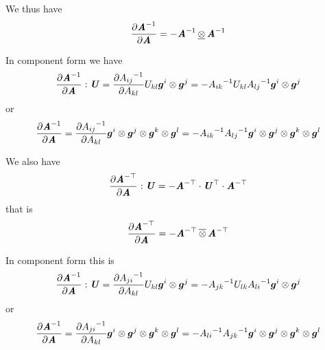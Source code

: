 We thus have
\begin{equation}
  \delby{\inverse{\tensortwo{A}}}{\tensortwo{A}}=\lowertensorprod{-\inverse{\tensortwo{A}}}{\inverse{\tensortwo{A}}}
  \label{eqn:DerivInverseTensorSecondOrder}
\end{equation}

In component form we have
\begin{equation}
    \dfrac{\partial {\ensuremath{\boldsymbol{\mathit{A}}}}^{-1}}{\partial \boldsymbol{\mathit{A}}}  : \boldsymbol{\mathit{U}} = \dfrac{\partial {A_{ij}}^{-1}}{\partial A_{kl}} U_{kl}  \boldsymbol{g} ^{i} \otimes  \boldsymbol{g} ^{j} =-{A_{ik}}^{-1}U_{kl}{A_{lj}}^{-1}  \boldsymbol{g} ^{i} \otimes  \boldsymbol{g} ^{j} 
\end{equation}
or
\begin{equation}
   \dfrac{\partial {\ensuremath{\boldsymbol{\mathit{A}}}}^{-1}}{\partial \boldsymbol{\mathit{A}}} = \dfrac{\partial {A_{ij}}^{-1}}{\partial A_{kl}}   \boldsymbol{g} ^{i} \otimes  \boldsymbol{g} ^{j} \otimes  \boldsymbol{g} ^{k} \otimes  \boldsymbol{g} ^{l} =-{A_{ik}}^{-1}{A_{lj}}^{-1}  \boldsymbol{g} ^{i} \otimes  \boldsymbol{g} ^{j} \otimes  \boldsymbol{g} ^{k} \otimes  \boldsymbol{g} ^{l} 
\end{equation}

We also have
\begin{equation}
    \dfrac{\partial  {\ensuremath{\boldsymbol{\mathit{A}}}}^{- \top } }{\partial \boldsymbol{\mathit{A}}}  : \boldsymbol{\mathit{U}} =-  {\boldsymbol{\mathit{A}}}^{- \top }   \cdot   {\ensuremath{\boldsymbol{\mathit{U}}}}^{ \top }   \cdot   {\ensuremath{\boldsymbol{\mathit{A}}}}^{- \top }  
\end{equation}
that is
\begin{equation}
  \delby{\invtranspose{\tensortwo{A}}}{\tensortwo{A}}=\uppertensorprod{-\invtranspose{\tensortwo{A}}}{\invtranspose{\tensortwo{A}}}
  \label{eqn:DerivInverseTransposeTensorSecondOrder}
\end{equation}

In component form this is
\begin{equation}
    \dfrac{\partial {\ensuremath{\boldsymbol{\mathit{A}}}}^{-1}}{\partial \boldsymbol{\mathit{A}}}  : \boldsymbol{\mathit{U}} = \dfrac{\partial {A_{ji}}^{-1}}{\partial A_{kl}} U_{kl}  \boldsymbol{g} ^{i} \otimes  \boldsymbol{g} ^{j} =-{A_{jk}}^{-1}U_{lk}{A_{li}}^{-1}  \boldsymbol{g} ^{i} \otimes  \boldsymbol{g} ^{j} 
\end{equation}
or
\begin{equation}
   \dfrac{\partial {\ensuremath{\boldsymbol{\mathit{A}}}}^{-1}}{\partial \boldsymbol{\mathit{A}}} = \dfrac{\partial {A_{ji}}^{-1}}{\partial A_{kl}}   \boldsymbol{g} ^{i} \otimes  \boldsymbol{g} ^{j} \otimes  \boldsymbol{g} ^{k} \otimes  \boldsymbol{g} ^{l} =-{A_{li}}^{-1}{A_{jk}}^{-1}  \boldsymbol{g} ^{i} \otimes  \boldsymbol{g} ^{j} \otimes  \boldsymbol{g} ^{k} \otimes  \boldsymbol{g} ^{l} 
\end{equation}

